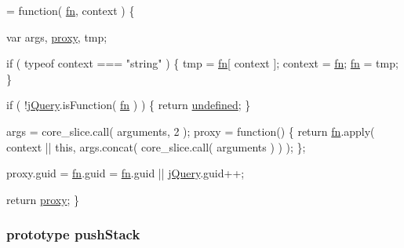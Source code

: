 \begin{DoxyCode}
= \textcolor{keyword}{function}( \hyperlink{jquery-1_810_82-vsdoc_8js_acef6bdaf6b9b20fdcca1ea86f0902c3b}{fn}, context ) \{


        var args, \hyperlink{jquery-1_810_82-vsdoc_8js_af0c0a2dd63f5d59bf5dea9f132dec59e}{proxy}, tmp;

        \textcolor{keywordflow}{if} ( typeof context === \textcolor{stringliteral}{"string"} ) \{
            tmp = \hyperlink{jquery-1_810_82-vsdoc_8js_acef6bdaf6b9b20fdcca1ea86f0902c3b}{fn}[ context ];
            context = \hyperlink{jquery-1_810_82-vsdoc_8js_acef6bdaf6b9b20fdcca1ea86f0902c3b}{fn};
            \hyperlink{jquery-1_810_82-vsdoc_8js_acef6bdaf6b9b20fdcca1ea86f0902c3b}{fn} = tmp;
        \}

        
        
        \textcolor{keywordflow}{if} ( !\hyperlink{jquery-1_810_82-vsdoc_8js_add5237586d970a38a81f990e8eb28c6c}{jQuery}.isFunction( \hyperlink{jquery-1_810_82-vsdoc_8js_acef6bdaf6b9b20fdcca1ea86f0902c3b}{fn} ) ) \{
            \textcolor{keywordflow}{return} \hyperlink{jquery-1_810_82-vsdoc_8js_a08113a236cc18d2a9d5ce27e638012be}{undefined};
        \}

        
        args = core\_slice.call( arguments, 2 );
        proxy = \textcolor{keyword}{function}() \{
            \textcolor{keywordflow}{return} \hyperlink{jquery-1_810_82-vsdoc_8js_acef6bdaf6b9b20fdcca1ea86f0902c3b}{fn}.apply( context || \textcolor{keyword}{this}, args.concat( core\_slice.call( arguments ) ) );
        \};

        
        proxy.guid = \hyperlink{jquery-1_810_82-vsdoc_8js_acef6bdaf6b9b20fdcca1ea86f0902c3b}{fn}.guid = \hyperlink{jquery-1_810_82-vsdoc_8js_acef6bdaf6b9b20fdcca1ea86f0902c3b}{fn}.guid || \hyperlink{jquery-1_810_82-vsdoc_8js_add5237586d970a38a81f990e8eb28c6c}{jQuery}.guid++;

        \textcolor{keywordflow}{return} \hyperlink{jquery-1_810_82-vsdoc_8js_af0c0a2dd63f5d59bf5dea9f132dec59e}{proxy};
    \}
\end{DoxyCode}
\hypertarget{jquery-1_810_82-vsdoc_8js_afc3a7db1ef2b526338c06c07cecccd44}{
\subsubsection[{push\-Stack}]{ {\bf prototype} push\-Stack}}\label{jquery-1_810_82-vsdoc_8js_afc3a7db1ef2b526338c06c07cecccd44}
